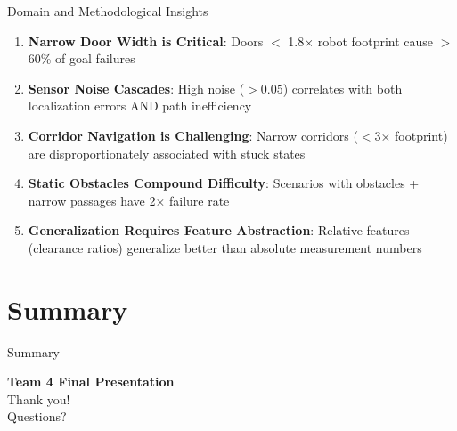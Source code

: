 \documentclass[aspectratio=169, 11pt]{beamer}
\begin{document}
\begin{frame}{Domain and Methodological Insights}
  \begin{enumerate}
    \item \textbf{Narrow Door Width is Critical}: Doors $<$ 1.8× robot footprint cause $>$60\% of goal failures
    
    \vspace{0.2cm}
    
    \item \textbf{Sensor Noise Cascades}: High noise ($>$0.05) correlates with both localization errors AND path inefficiency
    
    \vspace{0.2cm}
    
    \item \textbf{Corridor Navigation is Challenging}: Narrow corridors ($<$3× footprint) are disproportionately associated with stuck states
    
    \vspace{0.2cm}
    
    \item \textbf{Static Obstacles Compound Difficulty}: Scenarios with obstacles + narrow passages have 2× failure rate
    
    \vspace{0.2cm}
    
    \item \textbf{Generalization Requires Feature Abstraction}: Relative features (clearance ratios) generalize better than absolute measurement numbers
  \end{enumerate}
\end{frame}

\section{Summary}

\begin{frame}{Summary}
  \begin{center}
    \Large\textcolor{uniblue}{\textbf{Team 4 Final Presentation}}\\
    \vspace{0.5cm}
    \normalsize Thank you!\\
    \vspace{0.3cm}
    Questions?
  \end{center}
\end{frame}
\fi
\end{document}
